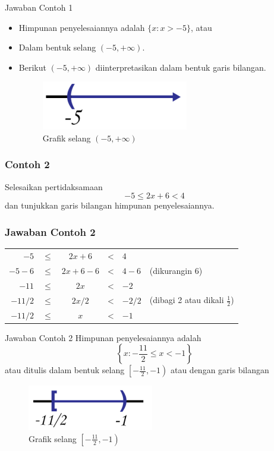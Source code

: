 \documentclass[pdflatex,compress,mathserif]{beamer}
\begin{document}
		\begin{frame}{Jawaban Contoh 1}
			\begin{itemize}
				\item Himpunan penyelesaiannya adalah $ \{ x : x > -5 \} $, atau \item Dalam bentuk selang $ (-5,+\infty) $.
				\item Berikut $ (-5,+\infty) $ diinterpretasikan dalam bentuk garis bilangan.
				\begin{figure}
					\centering
					\includegraphics[width=0.3\linewidth]{pict/11}
					\caption{Grafik selang $(-5,+\infty)$}
					\label{fig:11}
				\end{figure}
			\end{itemize}
		\end{frame}
		
		\begin{frame}
			\frametitle{Contoh 2}
			Selesaikan pertidaksamaan
			\begin{equation*}
				-5 \leq 2x + 6 < 4
			\end{equation*}
			dan tunjukkan garis bilangan himpunan penyelesaiannya.
		\end{frame}
	
		\begin{frame}
			\frametitle{Jawaban Contoh 2}
			\begin{tabular}{rcccll}
				$ -5 $ & $\leq$ & $ 2x + 6 $ & < & $ 4 $ &  \\
				$ -5-6 $ & $\leq$ & $ 2x + 6 - 6 $ & < & $ 4 - 6 $ & (dikurangin 6) \\
				$ -11 $ & $\leq$ & $ 2x $ & < & $ -2 $ & \\
				$-11/2$ & $\leq$ & $2x/2$ & < & $-2/2$ & (dibagi 2 atau dikali $\frac{1}{2}$)\\
				$ -11/2 $ & $\leq$ & $ x $ & < & $ -1 $ &  \\
			\end{tabular}
		\end{frame}
		
		\begin{frame}{Jawaban Contoh 2}
			Himpunan penyelesaiannya adalah
			\begin{equation*}
				\left\{ x:-\frac{11}{2} \leq x < -1 \right\}
			\end{equation*}
			atau ditulis dalam bentuk selang $ \left[ -\frac{11}{2}, -1 \right) $ atau dengan garis bilangan
			\begin{figure}
				\centering
				\includegraphics[width=0.3\linewidth]{pict/12}
				\caption{Grafik selang $ \left[ -\frac{11}{2}, -1 \right) $ }
				\label{fig:12}
			\end{figure}
		\end{frame}
		
\end{document}
